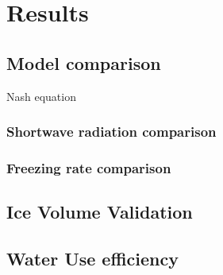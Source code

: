 \documentclass[tc, manuscript]{copernicus}
\begin{document}

\section{Results}
\subsection{Model comparison}
Nash equation

\subsubsection{Shortwave radiation comparison}

\subsubsection{Freezing rate comparison}

\subsection{Ice Volume Validation}



\subsection{Water Use efficiency}

\end{document}
